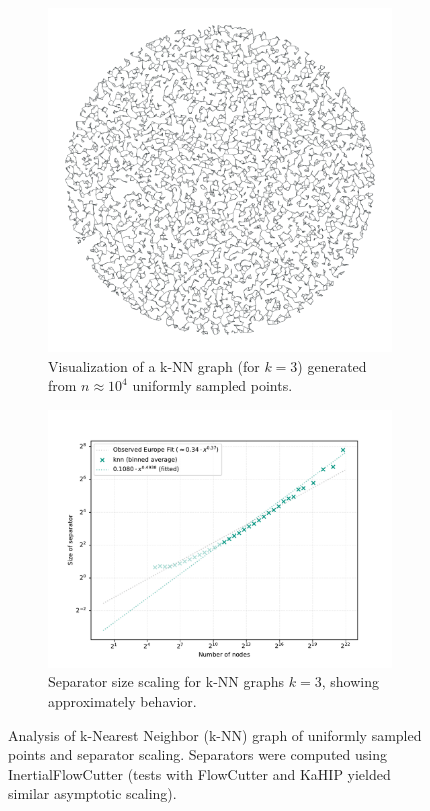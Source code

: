 \begin{figure}[tbhp]
	\centering
	\begin{subfigure}{0.35\linewidth}
		\centering
		\includegraphics[width=\linewidth]{graphics/knn.png}
		\caption{Visualization of a k-NN graph (for \(k=3\)) generated from \(n \approx 10^4\) uniformly sampled points.}
		\label{fig:knn_graph_structure_viz}
	\end{subfigure}
	\hfill
	\begin{subfigure}{0.55\linewidth}
		\centering
		\includegraphics[width=\linewidth]{graphics/knn_seps.pdf}
		\caption{Separator size scaling for k-NN graphs \(k=3\), showing approximately  behavior.}
		\label{fig:knn_graph_sep_scaling_plot}
	\end{subfigure}
	\caption{Analysis of k-Nearest Neighbor (k-NN) graph of uniformly sampled points and separator scaling. Separators were computed using InertialFlowCutter (tests with FlowCutter and KaHIP yielded similar asymptotic scaling).}
	\label{fig:knn_graph_analysis}
\end{figure}

